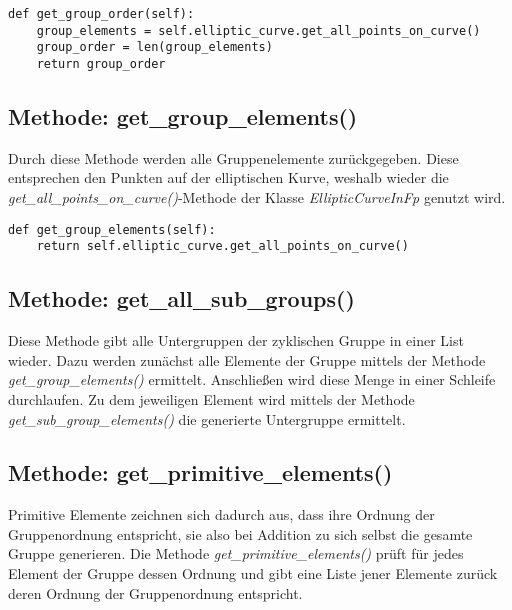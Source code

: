 \vspace{\baselineskip}
\begin{lstlisting}[caption={Methode: get\_group\_order()}, captionpos=b]
def get_group_order(self):
    group_elements = self.elliptic_curve.get_all_points_on_curve()
    group_order = len(group_elements)
    return group_order
\end{lstlisting}
\vspace{\baselineskip}

\subsection{Methode: get\_group\_elements()}
Durch diese Methode werden alle Gruppenelemente zurückgegeben. Diese entsprechen den Punkten auf der elliptischen Kurve, weshalb wieder die \textit{get\_all\_points\_on\_curve()}-Methode der Klasse \textit{EllipticCurveInFp} genutzt wird.

\vspace{\baselineskip}
\begin{lstlisting}[caption={Methode: get\_group\_elements()}, captionpos=b]
def get_group_elements(self):
	return self.elliptic_curve.get_all_points_on_curve()
\end{lstlisting}
\vspace{\baselineskip}
  
\subsection{Methode: get\_all\_sub\_groups()}
Diese Methode gibt alle Untergruppen der zyklischen Gruppe in einer List wieder. Dazu werden zunächst alle Elemente der Gruppe mittels der Methode \textit{get\_group\_elements()} ermittelt. Anschließen wird diese Menge in einer Schleife durchlaufen. Zu dem jeweiligen Element wird mittels der Methode \textit{get\_sub\_group\_elements()} die generierte Untergruppe ermittelt. 

\subsection{Methode: get\_primitive\_elements()}
Primitive Elemente zeichnen sich dadurch aus, dass ihre Ordnung der Gruppenordnung entspricht, sie also bei Addition zu sich selbst die gesamte Gruppe generieren. Die Methode \textit{get\_primitive\_elements()} prüft für jedes Element der Gruppe dessen Ordnung und gibt eine Liste jener Elemente zurück deren Ordnung der Gruppenordnung entspricht.

